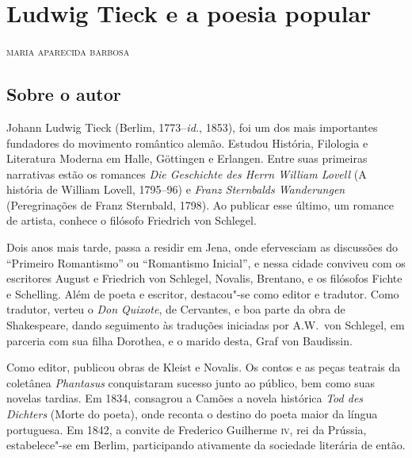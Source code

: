 \chapter{Ludwig Tieck e a poesia popular}

\begin{flushright}
\textsc{maria aparecida barbosa}
\end{flushright}

\section{Sobre o autor}

\noindent{}Johann Ludwig Tieck (Berlim, 1773--\textit{id.}, 1853), 
foi um dos mais importantes fundadores do movimento romântico alemão. 
Estudou História, Filologia e Literatura Moderna em Halle, 
Göttingen e Erlangen. Entre suas primeiras narrativas estão os romances 
\textit{Die Geschichte des Herrn William Lovell} (A história de William Lovell, 
1795--96) e \textit{Franz Sternbalds Wanderungen} 
(Peregrinações de Franz Sternbald, 1798). 
Ao publicar esse último, um romance de artista, conhece o filósofo 
Friedrich von Schlegel.

Dois anos mais tarde, passa a residir em Jena, 
onde efervesciam as  discussões do ``Primeiro Romantismo'' ou ``Romantismo 
Inicial'', e nessa  cidade conviveu com os escritores August e Friedrich von Schlegel,  Novalis, Brentano, e os filósofos Fichte e Schelling. Além de poeta e escritor, destacou"-se como editor e tradutor. Como tradutor, verteu o \textit{Don Quixote}, de Cervantes, e boa parte da obra de Shakespeare, dando seguimento às traduções iniciadas por A.W.~von Schlegel, 
em parceria com sua filha Dorothea, e o marido desta,
Graf von Baudissin.

Como editor, publicou obras de Kleist e Novalis.
Os contos e as peças teatrais da coletânea \textit{Phantasus} conquistaram 
sucesso junto ao público, bem como suas novelas tardias. Em 1834, consagrou 
a Camões a novela histórica \textit{Tod des Dichters} (Morte do poeta), onde 
reconta o destino do poeta maior da língua portuguesa. Em 1842, a convite 
de Frederico Guilherme \textsc{iv}, rei da Prússia, estabelece"-se em Berlim, 
participando ativamente da sociedade literária de então.


